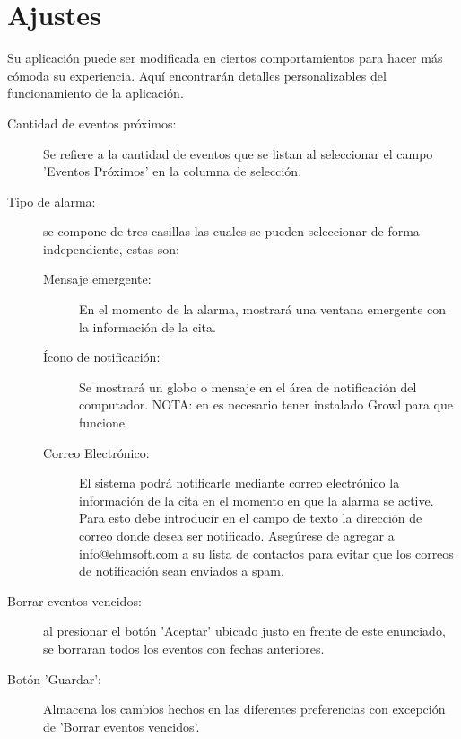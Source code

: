 \chapter{Ajustes}
\label{sec:preferencias}
Su aplicaci\'on puede ser modificada en ciertos comportamientos para hacer
m\'as c\'omoda su experiencia. Aqu\'i  encontrar\'an  detalles  personalizables del funcionamiento de la aplicaci\'on.

\begin{description}
\item[Cantidad de eventos pr\'oximos:] Se refiere a la cantidad de eventos que se listan al seleccionar el campo 'Eventos Pr\'oximos' en la columna de selecci\'on.
 \item[Tipo de alarma:]  se compone de tres casillas  las cuales se pueden seleccionar de forma independiente, estas son:
\begin{description}
     	\item[Mensaje emergente:] En el momento de la alarma, mostrar\'a una ventana emergente con la informaci\'on de la cita.
     	\item[\'Icono de notificaci\'on:] Se mostrar\'a un globo o mensaje en el \'area de notificaci\'on del computador. NOTA: en \mac es necesario tener instalado Growl para que funcione
     	\item[Correo Electr\'onico:] El sistema podr\'a notificarle mediante correo electr\'onico la informaci\'on de la cita en el momento en que la alarma se active. Para esto debe introducir en el campo de texto la direcci\'on de correo donde desea ser notificado. Aseg\'urese de agregar a info@ehmsoft.com a su lista de contactos para evitar que los correos de notificaci\'on sean enviados a spam.
\end{description}
\item[Borrar eventos vencidos:] al presionar el bot\'on 'Aceptar' ubicado justo en frente de este enunciado, se borraran todos los eventos con fechas anteriores.
\item[Bot\'on 'Guardar':] Almacena los cambios hechos en las diferentes preferencias con excepci\'on de 'Borrar eventos vencidos'.
\end{description}